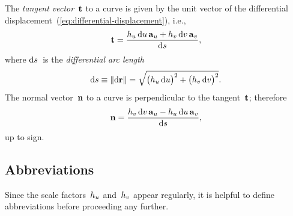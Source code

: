 The \emph{tangent vector}~$\mathop{}\!\boldsymbol{\mathrm{t}}$ to a curve
is given by the unit vector of
the differential displacement~(\ref{eq:differential-displacement}),
i.e.,
\begin{equation}
  \tangentvec =
    \frac{
      \scalefac[u] \td u \basisvec{u}
        +
      \scalefac[v] \td v \basisvec{v}
    }{
      \td s
    },
  \label{eq:tangent-vector}
\end{equation}
where $\mathop{}\!\mathrm{d} s$~is the \emph{differential arc length}
\begin{equation}
  \td s \defeq \norm{\td \positionvec} =
  \sqrt{
    \roundbr[\big]{\scalefac[u] \td u}^2
      +
    \roundbr[\big]{\scalefac[v] \td v}^2
  }.
  \label{eq:differential-arc-length}
\end{equation}
The normal vector~$\mathop{}\!\boldsymbol{\mathrm{n}}$ to a curve
is perpendicular to the tangent~$\mathop{}\!\boldsymbol{\mathrm{t}}$;
therefore
\begin{equation}
  \normalvec =
    \frac{
      \scalefac[v] \td v \basisvec{u}
        -
      \scalefac[u] \td u \basisvec{v}
    }{
      \td s
    },
  \label{eq:normal-vector}
\end{equation}
up to sign.

\subsection{Abbreviations}
\label{sec:curvilinear.calculus.abbreviations}

Since the scale factors~$\scalefac[u]$ and~$\scalefac[v]$ appear regularly,
it is helpful to define abbreviations
before proceeding any further.

